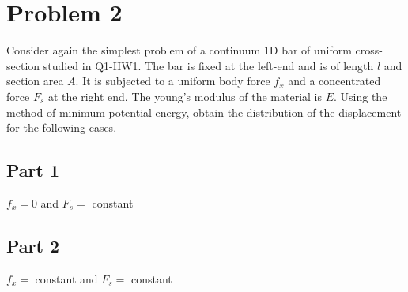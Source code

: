 \documentclass{article}
\begin{document}
\section*{Problem 2}
Consider again the simplest problem of a continuum 1D bar of uniform cross-section studied in Q1-HW1.
The bar is fixed at the left-end and is of length $l$ and section area $A$. It is subjected to a uniform body
force $f_x$ and a concentrated force $F_s$ at the right end. The young’s modulus of the material is $E$. Using
the method of minimum potential energy, obtain the distribution of the displacement for the following cases.

\subsection*{Part 1}
$f_x=0$ and $F_s=$ constant

\subsection*{Part 2}
$f_x=$ constant and $F_s=$ constant
\end{document}
